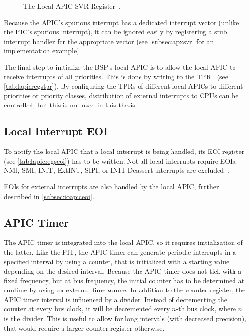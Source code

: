 \begin{figure}[h]
  \centering
  \begin{subfigure}[b]{0.7\textwidth}
    
  \end{subfigure}
  \caption{The Local APIC SVR Register~\autocite[sec.~3.11.9]{ia32}.}
  \label{fig:ia32apicsvr}
\end{figure}

Because the APIC's spurious interrupt has a dedicated interrupt vector (unlike the PIC's spurious interrupt), it can be ignored easily by registering a stub interrupt handler for the appropriate vector (see \autoref{subsec:apxsvr} for an implementation example).

The final step to initialize the BSP's local APIC is to allow the local APIC to receive interrupts of all priorities.
This is done by writing  to the TPR~\autocite[sec.~3.11.8.3]{ia32} (see \autoref{tab:lapicregstpr}).
By configuring the TPRs of different local APICs to different priorities or priority classes, distribution of external interrupts to CPUs can be controlled, but this is not used in this thesis.

\subsection{Local Interrupt EOI}
\label{subsec:lapiceoi}

To notify the local APIC that a local interrupt is being handled, its EOI register (see \autoref{tab:lapicregseoi}) has to be written.
Not all local interrupts require EOIs: NMI, SMI, INIT, ExtINT, SIPI, or INIT-Deassert interrupts are excluded~\autocite[sec.~3.11.8.5]{ia32}.

EOIs for external interrupts are also handled by the local APIC, further described in \autoref{subsec:ioapiceoi}.

\subsection{APIC Timer}
\label{subsec:lapictimer}

The APIC timer is integrated into the local APIC, so it requires initialization of the latter.
Like the PIT, the APIC timer can generate periodic interrupts in a specified interval by using a counter, that is initialized with a starting value depending on the desired interval.
Because the APIC timer does not tick with a fixed frequency, but at bus frequency, the initial counter has to be determined at runtime by using an external time source.
In addition to the counter register, the APIC timer interval is influenced by a divider: Instead of decrementing the counter at every bus clock, it will be decremented every \(n\)-th bus clock, where \(n\) is the divider.
This is useful to allow for long intervals (with decreased precision), that would require a larger counter register otherwise.

